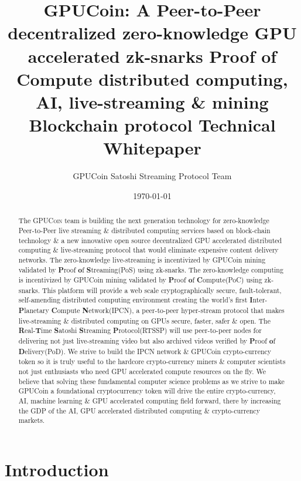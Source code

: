 \documentclass{article}
\title{GPUCoin: A Peer-to-Peer decentralized 
zero-knowledge 
GPU accelerated 
 zk-snarks Proof of Compute distributed computing, AI, live-streaming \& 
 mining Blockchain protocol 
 Technical Whitepaper}
\author{GPUCoin Satoshi Streaming Protocol Team}
\date{\today}
\begin{document}

\maketitle

\begin{abstract}
The \textsc{GPUCoin} team is building the next generation technology for zero-knowledge Peer-to-Peer live streaming \& distributed computing services based on block-chain technology \& a new innovative open source decentralized GPU accelerated distributed computing \& live-streaming protocol that would eliminate expensive content delivery networks. The zero-knowledge live-streaming is incentivized by GPUCoin mining validated by \textbf{P}roof \textbf{o}f \textbf{S}treaming(PoS) using zk-snarks. The zero-knowledge computing is incentivized by GPUCoin mining validated by \textbf{P}roof \textbf{o}f \textbf{C}ompute(PoC) using zk-snarks. This platform will provide a web scale cryptographically secure, fault-tolerant, self-amending distributed computing environment creating the world's first \textbf{I}nter-\textbf{P}lanetary \textbf{C}ompute \textbf{N}etwork(\textsc{IPCN}), a peer-to-peer hyper-stream protocol that makes live-streaming \& distributed computing on GPUs secure, faster, safer \& open. The \textbf{R}eal-\textbf{T}ime \textbf{S}atoshi \textbf{S}treaming \textbf{P}rotocol(RTSSP) will use peer-to-peer nodes for delivering not just live-streaming video but also archived videos verified by \textbf{P}roof \textbf{o}f \textbf{D}elivery(PoD). We strive to build the IPCN network \& GPUCoin crypto-currency token so it is truly useful to the hardcore crypto-currency miners \& computer scientists not just enthusiasts who need GPU accelerated compute resources on the fly. We believe that solving these fundamental computer science problems as we strive to make GPUCoin a foundational cryptocurrency token will drive the entire crypto-currency, AI, machine learning \& GPU accelerated computing field forward, there by increasing the GDP of the AI, GPU accelerated distributed computing \& crypto-currency markets.

\end{abstract}
\newpage

\tableofcontents
\newpage

\section{Introduction}
\end{document}
